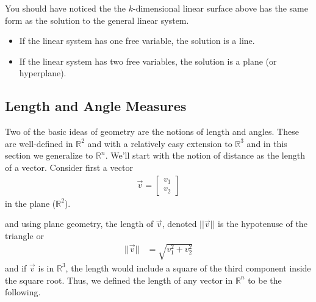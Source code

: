 You should have noticed the the $k$-dimensional linear surface above has the same form as the solution to the general linear system.

\begin{itemize}
\item If the linear system has one free variable, the solution is a line.
\item If the linear system has two free variables, the solution is a plane (or hyperplane).
\end{itemize}


\subsection{Length and Angle Measures}  \label{sect:length:angles}

Two  of the basic ideas of geometry are the notions of length and angles.  These are well-defined in $\mathbb{R}^2$ and with a relatively easy extension to $\mathbb{R}^3$ and in this section we generalize to $\mathbb{R}^n$.   We'll start with the notion of distance as the length of a vector.  Consider first a vector
%
\begin{align*}
\vec{v} = \begin{bmatrix}
v_1 \\ v_2
\end{bmatrix}
\end{align*}
in the plane ($\mathbb{R}^2$).
\begin{center}
\end{center}
and using plane geometry, the length of $\vec{v}$, denoted $||\vec{v}||$ is the hypotenuse of the triangle or
%
\begin{align*}
||\vec{v}|| & = \sqrt{v_1^2+v_2^2}
\end{align*}
and if $\vec{v}$ is in $\mathbb{R}^3$, the length would include a square of the third component inside the square root.  Thus, we defined the length of any vector in $\mathbb{R}^n$ to be the following.

